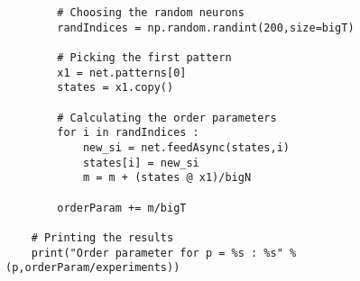 \documentclass{article}
\begin{document}
\begin{verbatim}
        # Choosing the random neurons
        randIndices = np.random.randint(200,size=bigT)
        
        # Picking the first pattern
        x1 = net.patterns[0]
        states = x1.copy()

        # Calculating the order parameters
        for i in randIndices :
            new_si = net.feedAsync(states,i)
            states[i] = new_si
            m = m + (states @ x1)/bigN

        orderParam += m/bigT

    # Printing the results    
    print("Order parameter for p = %s : %s" % (p,orderParam/experiments))

\end{verbatim}
\end{document}
